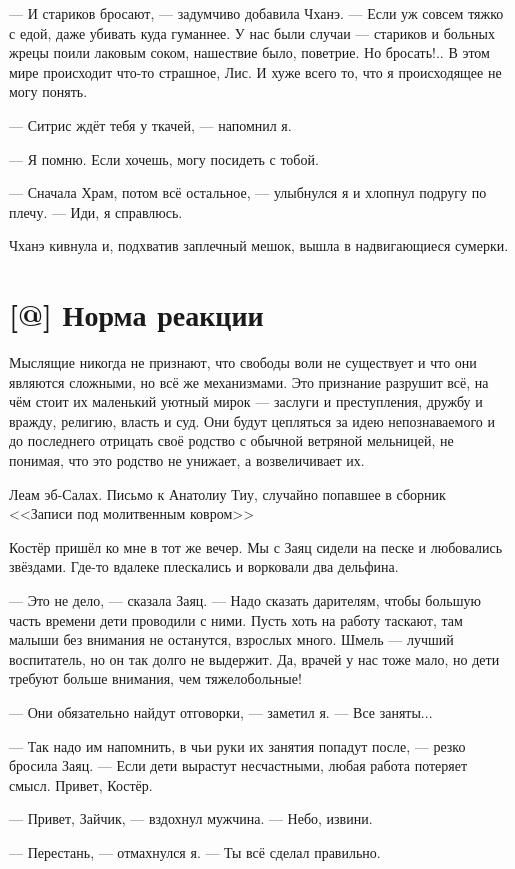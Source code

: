 --- И стариков бросают, --- задумчиво добавила Чханэ.
--- Если уж совсем тяжко с едой, даже убивать куда гуманнее.
У нас были случаи --- стариков и больных жрецы поили лаковым соком, нашествие было, поветрие.
Но бросать!..
В этом мире происходит что-то страшное, Лис.
И хуже всего то, что я происходящее не могу понять.

--- Ситрис ждёт тебя у ткачей, --- напомнил я.

--- Я помню.
Если хочешь, могу посидеть с тобой.

--- Сначала Храм, потом всё остальное, --- улыбнулся я и хлопнул подругу по плечу.
--- Иди, я справлюсь.

Чханэ кивнула и, подхватив заплечный мешок, вышла в надвигающиеся сумерки.

\section{[@] Норма реакции}

\epigraph
{Мыслящие никогда не признают, что свободы воли не существует и что они являются сложными, но всё же механизмами.
Это признание разрушит всё, на чём стоит их маленький уютный мирок --- заслуги и преступления, дружбу и вражду, религию, власть и суд.
Они будут цепляться за идею непознаваемого и до последнего отрицать своё родство с обычной ветряной мельницей, не понимая, что это родство не унижает, а возвеличивает их.}
{Леам эб-Салах.
Письмо к Анатолиу Тиу, случайно попавшее в сборник <<Записи под молитвенным ковром>>}

Костёр пришёл ко мне в тот же вечер.
Мы с Заяц сидели на песке и любовались звёздами.
Где-то вдалеке плескались и ворковали два дельфина.

--- Это не дело, --- сказала Заяц.
--- Надо сказать дарителям, чтобы большую часть времени дети проводили с ними.
Пусть хоть на работу таскают, там малыши без внимания не останутся, взрослых много.
Шмель --- лучший воспитатель, но он так долго не выдержит.
Да, врачей у нас тоже мало, но дети требуют больше внимания, чем тяжелобольные!

--- Они обязательно найдут отговорки, --- заметил я.
--- Все заняты...

--- Так надо им напомнить, в чьи руки их занятия попадут после, --- резко бросила Заяц.
--- Если дети вырастут несчастными, любая работа потеряет смысл.
Привет, Костёр.

--- Привет, Зайчик, --- вздохнул мужчина.
--- Небо, извини.

--- Перестань, --- отмахнулся я.
--- Ты всё сделал правильно.

